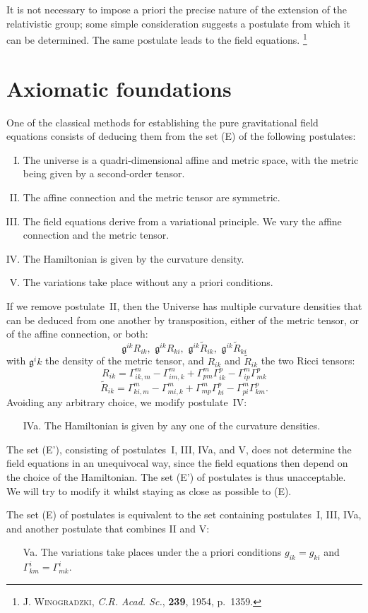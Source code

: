 \documentclass{article}
\theoremstyle{plain}
\theoremstyle{definition}
\renewcommand{\gg}{\mathfrak{g}}
\newcommand{\oldpage}[1]{\marginpar{\footnotesize$\Big\vert$ \textit{p.~#1}}}
\begin{document}
It is not necessary to impose a priori the precise nature of the extension of the relativistic group; some simple consideration suggests a postulate from which it can be determined.
The same postulate leads to the field equations.
\footnote{\textsc{J. Winogradzki}, \emph{C.R. Acad. Sc.}, \textbf{239}, 1954, p.~1359.}


\section{Axiomatic foundations}
\label{section1}

One of the classical methods for establishing the pure gravitational field equations consists of deducing them from the set (E) of the following postulates:
\begin{enumerate}[I.]
  \item The universe is a quadri-dimensional affine and metric space, with the metric being given by a second-order tensor.
  \item The affine connection and the metric tensor are symmetric.
  \item The field equations derive from a variational principle.
\oldpage{10-02}
    We vary the affine connection and the metric tensor.
  \item The Hamiltonian is given by the curvature density.
  \item The variations take place without any a priori conditions.
\end{enumerate}

If we remove postulate~II, then the Universe has multiple curvature densities that can be deduced from one another by transposition, either of the metric tensor, or of the affine connection, or both:
\[
  \gg^{ik}R_{ik}, \,\,
  \gg^{ik}R_{ki}, \,\,
  \gg^{ik}\widetilde{R}_{ik}, \,\,
  \gg^{ik}\widetilde{R}_{ki}
\]
with $\gg^ik$ the density of the metric tensor, and $R_{ik}$ and $\widetilde{R}_{ik}$ the two Ricci tensors:
\[
\label{equation1}
  R_{ik} = \Gamma_{ik,m}^m - \Gamma_{im,k}^m + \Gamma_{pm}^m\Gamma_{ik}^p - \Gamma_{ip}^m\Gamma_{mk}^p
  \tag{1}
\]
\[
\label{equation2}
  \widetilde{R}_{ik} = \Gamma_{ki,m}^m - \Gamma_{mi,k}^m + \Gamma_{mp}^m\Gamma_{ki}^p - \Gamma_{pi}^m\Gamma_{km}^p.
  \tag{2}
\]
Avoiding any arbitrary choice, we modify postulate~IV:
\begin{enumerate}
  \item[IVa.] The Hamiltonian is given by any one of the curvature densities.
\end{enumerate}

The set (E'), consisting of postulates~I, III, IVa, and V, does not determine the field equations in an unequivocal way, since the field equations then depend on the choice of the Hamiltonian.
The set (E') of postulates is thus unacceptable.
We will try to modify it whilst staying as close as possible to (E).

The set (E) of postulates is equivalent to the set containing postulates~I, III, IVa, and another postulate that combines II and V:
\begin{enumerate}
  \item[Va.] The variations take places under the a priori conditions $g_{ik}=g_{ki}$ and $\Gamma_{km}^i=\Gamma_{mk}^i$.
\end{enumerate}
\end{document}

